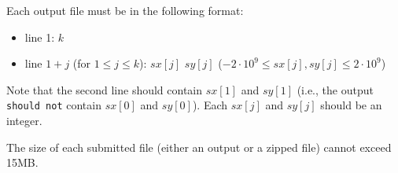 Each output file must be in the following format:
\begin{itemize}
\item line 1: $k$
\item line $1+j$ (for $1 \leq j \leq k$): $sx[j]$ $sy[j]$ ($-2 \cdot {10}^9 \leq sx[j], sy[j] \leq 2 \cdot {10}^9 $)
\end{itemize}

Note that the second line should contain $sx[1]$ and $sy[1]$ (i.e., the output \texttt{should not} contain $sx[0]$ and $sy[0]$).
Each $sx[j]$ and $sy[j]$ should be an integer.

The size of each submitted file (either an output or a zipped file) cannot exceed 15MB.